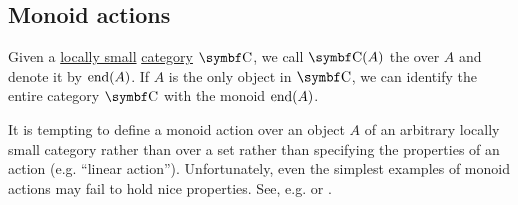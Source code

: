 \subsection{Monoid actions}\label{subsec:monoid_actions}

\begin{definition}\label{def:endomorphism_monoid}
  Given a \hyperref[def:category_cardinality]{locally small} \hyperref[def:category]{category} \( \Cat{C} \), we call \( \Cat{C}(A) \) the  over \( A \) and denote it by \( \operatorname{end}(A) \). If \( A \) is the only object in \( \Cat{C} \), we can identify the entire category \( \Cat{C} \) with the monoid \( \operatorname{end}(A) \).
\end{definition}

\begin{remark}\label{remark:monoid_action_endomorphisms}
  It is tempting to define a monoid action over an object \( A \) of an arbitrary locally small category rather than over a set rather than specifying the properties of an action (e.g. \enquote{linear action}). Unfortunately, even the simplest examples of monoid actions may fail to hold nice properties. See, e.g.  or .
\end{remark}

